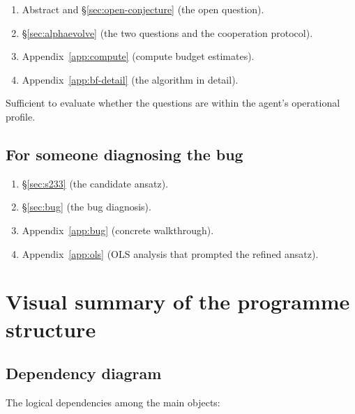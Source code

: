\documentclass[11pt,a4paper]{article}
\theoremstyle{plain}
\theoremstyle{definition}
\begin{document}
\begin{enumerate}
   \item Abstract and \S\ref{sec:open-conjecture} (the open
         question).
   \item \S\ref{sec:alphaevolve} (the two questions and the
         cooperation protocol).
   \item Appendix~\ref{app:compute} (compute budget estimates).
   \item Appendix~\ref{app:bf-detail} (the algorithm in detail).
\end{enumerate}
Sufficient to evaluate whether the questions are within the
agent's operational profile.

\subsection*{For someone diagnosing the bug}

\begin{enumerate}
   \item \S\ref{sec:s233} (the candidate ansatz).
   \item \S\ref{sec:bug} (the bug diagnosis).
   \item Appendix~\ref{app:bug} (concrete walkthrough).
   \item Appendix~\ref{app:ols} (OLS analysis that prompted the
         refined ansatz).
\end{enumerate}

\section{Visual summary of the programme structure}\label{app:visual}

\subsection*{Dependency diagram}

The logical dependencies among the main objects:
\end{document}
